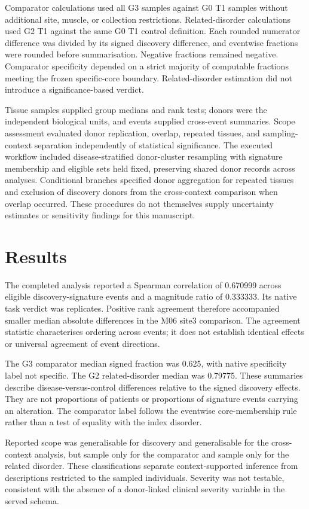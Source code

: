 \documentclass[10pt,a4paper]{article}
\begin{document}
\par
Comparator calculations used all G3 samples against G0 T1 samples without additional site, muscle, or collection restrictions. Related-disorder calculations used G2 T1 against the same G0 T1 control definition. Each rounded numerator difference was divided by its signed discovery difference, and eventwise fractions were rounded before summarisation. Negative fractions remained negative. Comparator specificity depended on a strict majority of computable fractions meeting the frozen specific-core boundary. Related-disorder estimation did not introduce a significance-based verdict.
\par
Tissue samples supplied group medians and rank tests; donors were the independent biological units, and events supplied cross-event summaries. Scope assessment evaluated donor replication, overlap, repeated tissues, and sampling-context separation independently of statistical significance. The executed workflow included disease-stratified donor-cluster resampling with signature membership and eligible sets held fixed, preserving shared donor records across analyses. Conditional branches specified donor aggregation for repeated tissues and exclusion of discovery donors from the cross-context comparison when overlap occurred. These procedures do not themselves supply uncertainty estimates or sensitivity findings for this manuscript.
\par
\section*{Results}
The completed analysis reported a Spearman correlation of 0.670999 across eligible discovery-signature events and a magnitude ratio of 0.333333. Its native task verdict was replicates. Positive rank agreement therefore accompanied smaller median absolute differences in the M06 site3 comparison. The agreement statistic characterises ordering across events; it does not establish identical effects or universal agreement of event directions.
\par
The G3 comparator median signed fraction was 0.625, with native specificity label not specific. The G2 related-disorder median was 0.79775. These summaries describe disease-versus-control differences relative to the signed discovery effects. They are not proportions of patients or proportions of signature events carrying an alteration. The comparator label follows the eventwise core-membership rule rather than a test of equality with the index disorder.
\par
Reported scope was generalisable for discovery and generalisable for the cross-context analysis, but sample only for the comparator and sample only for the related disorder. These classifications separate context-supported inference from descriptions restricted to the sampled individuals. Severity was not testable, consistent with the absence of a donor-linked clinical severity variable in the served schema.
\par
\end{document}
